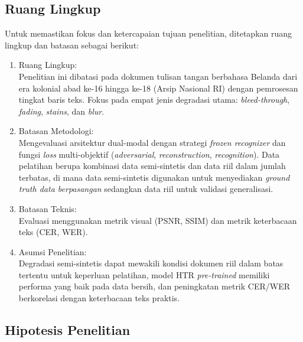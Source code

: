 \documentclass[12pt,a4paper]{book}
\begin{document}
\subsection{Ruang Lingkup}
\label{subsec:ruang-lingkup}

Untuk memastikan fokus dan ketercapaian tujuan penelitian, ditetapkan ruang lingkup dan batasan sebagai berikut:

\begin{enumerate}[label=\arabic*., leftmargin=0.5cm]
    \item Ruang Lingkup: \\
    Penelitian ini dibatasi pada dokumen tulisan tangan berbahasa Belanda dari era kolonial abad ke-16 hingga ke-18 (Arsip Nasional RI) dengan pemrosesan tingkat baris teks. Fokus pada empat jenis degradasi utama: \textit{bleed-through}, \textit{fading}, \textit{stains}, dan \textit{blur}.


    \item Batasan Metodologi: \\
    Mengevaluasi arsitektur dual-modal dengan strategi \textit{frozen recognizer} dan fungsi \textit{loss} multi-objektif (\textit{adversarial}, \textit{reconstruction}, \textit{recognition}). Data pelatihan berupa kombinasi data semi-sintetis dan data riil dalam jumlah terbatas, di mana data semi-sintetis digunakan untuk menyediakan \textit{ground truth data berpasangan} sedangkan data riil untuk validasi generalisasi.


    \item Batasan Teknis: \\
    Evaluasi menggunakan metrik visual (PSNR, SSIM) dan metrik keterbacaan teks (CER, WER).


    \item Asumsi Penelitian: \\
    Degradasi semi-sintetis dapat mewakili kondisi dokumen riil dalam batas tertentu untuk keperluan pelatihan, model HTR \textit{pre-trained} memiliki performa yang baik pada data bersih, dan peningkatan metrik CER/WER berkorelasi dengan keterbacaan teks praktis.
\end{enumerate}

\vspace{0.8em}
\subsection{Hipotesis Penelitian}
\label{subsec:hipotesis}
\end{document}
